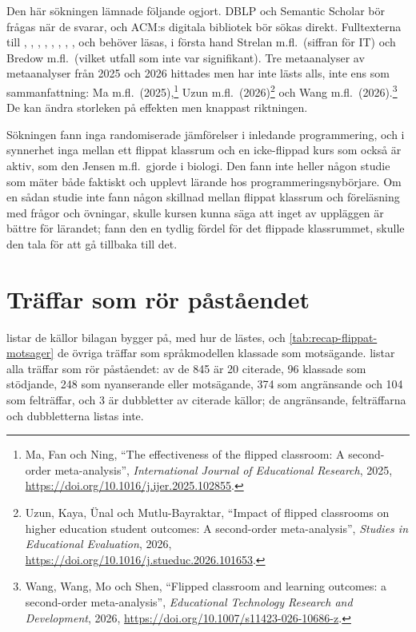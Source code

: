 Den här sökningen lämnade följande ogjort.  DBLP och Semantic Scholar bör
frågas när de svarar, och ACM:s digitala bibliotek bör sökas direkt.
Fulltexterna till \textcite{Strelan2020}, \textcite{Bredow2021},
\textcite{Hew2021methodology}, \textcite{Liu2026},
\textcite{Giannakos2014}, \textcite{Gillette2018}, \textcite{Tyler2018},
\textcite{Jones2026}, \textcite{Elliott2014} och \textcite{SoosaiRaj2018}
behöver läsas, i första hand Strelan m.fl.\ (siffran för IT) och Bredow
m.fl.\ (vilket utfall som inte var signifikant).  Tre metaanalyser av
metaanalyser från 2025 och 2026 hittades men har inte lästs alls, inte
ens som sammanfattning: Ma m.fl.\ (2025),\footnote{Ma, Fan och Ning,
\enquote{The effectiveness of the flipped classroom: A second-order
meta-analysis}, \emph{International Journal of Educational Research},
2025, \url{https://doi.org/10.1016/j.ijer.2025.102855}.} Uzun m.fl.\
(2026)\footnote{Uzun, Kaya, Ünal och Mutlu-Bayraktar, \enquote{Impact of
flipped classrooms on higher education student outcomes: A second-order
meta-analysis}, \emph{Studies in Educational Evaluation}, 2026,
\url{https://doi.org/10.1016/j.stueduc.2026.101653}.} och Wang m.fl.\
(2026).\footnote{Wang, Wang, Mo och Shen, \enquote{Flipped classroom and
learning outcomes: a second-order meta-analysis}, \emph{Educational
Technology Research and Development}, 2026,
\url{https://doi.org/10.1007/s11423-026-10686-z}.} De kan ändra
storleken på effekten men knappast riktningen.

Sökningen fann inga randomiserade jämförelser i inledande programmering,
och i synnerhet inga mellan ett flippat klassrum och en icke-flippad kurs
som också är aktiv, som den Jensen m.fl.\ gjorde i biologi.  Den fann
inte heller någon studie som mäter både faktiskt och upplevt lärande hos
programmeringsnybörjare.  Om en sådan studie inte fann någon skillnad
mellan flippat klassrum och föreläsning med frågor och övningar, skulle
kursen kunna säga att inget av uppläggen är bättre för lärandet; fann den
en tydlig fördel för det flippade klassrummet, skulle den tala för att gå
tillbaka till det.

\section{Träffar som rör påståendet}

 listar de källor bilagan bygger på, med
hur de lästes, och \cref{tab:recap-flippat-motsager} de övriga träffar som
språkmodellen klassade som motsägande.  \Cref{tab:sok-recap-flippat}
listar alla träffar som rör påståendet: av de 845 är 20 citerade, 96
klassade som stödjande, 248 som nyanserande eller motsägande, 374 som
angränsande och 104 som felträffar, och 3 är dubbletter av citerade
källor; de angränsande, felträffarna och dubbletterna listas inte.






